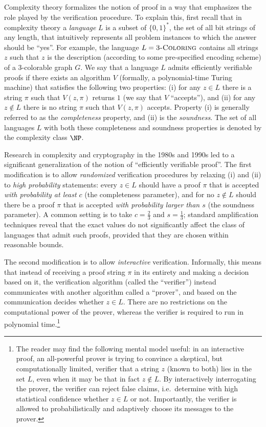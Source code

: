 Complexity theory formalizes the notion of proof in a way that emphasizes the role played by the verification procedure. To explain this, first recall that in complexity theory a \emph{language} $L$ is a subset of $\{0,1\}^*$, the set of all bit strings of any length, that intuitively represents all problem instances to which the answer should be ``yes''. For example, the language $L=\textsc{3-Coloring}$ contains all strings $z$ such that $z$ is the description (according to some pre-specified encoding scheme) of a $3$-colorable graph $G$. We say that a language $L$ admits efficiently verifiable proofs if there exists an algorithm $V$ (formally, a polynomial-time Turing machine) that satisfies the following two properties: (i) for any $z\in L$ there is a string $\pi$ such that $V(z,\pi)$ returns $1$ (we say that $V$ ``accepts''), and (ii) for any $z\notin L$ there is no string $\pi$ such that $V(z,\pi)$ accepts. Property (i) is generally referred to as the \emph{completeness} property, and (ii) is the \emph{soundness}. The set of all languages $L$ with both these completeness and soundness properties is denoted by the complexity class $\NP$.


Research in complexity and cryptography in the 1980s and 1990s led to a significant generalization of the notion of ``efficiently verifiable proof''. The first modification is to allow \emph{randomized} verification procedures by relaxing (i) and (ii) to \emph{high probability} statements: every $z\in L$ should have a proof $\pi$ that is accepted \emph{with probability at least $c$} (the completeness parameter), and for no $z\notin L$ should there be a proof $\pi$ that is accepted \emph{with probability larger than $s$} (the soundness parameter).
A common setting is to take $c=\frac{2}{3}$ and $s=\frac{1}{3}$; standard amplification techniques reveal that the exact values do not significantly affect the class of languages that admit such proofs, provided that they are chosen within reasonable bounds. 

The second modification is to allow \emph{interactive} verification. 
Informally, this means that instead of receiving a proof string $\pi$ in its entirety and making a decision based on it, the verification algorithm (called the ``verifier'') instead communicates with another algorithm called a ``prover'', and based on the communication decides whether $z\in L$. There are no restrictions on the computational power of the prover, whereas the verifier is required to run in polynomial time.\footnote{The reader may find the following mental model useful: in an interactive proof, an all-powerful prover is trying to convince a skeptical, but computationally limited, verifier that a string $z$ (known to both) lies in the set $L$, even when it may be that in fact $z \notin L$. By interactively interrogating the prover, the verifier can reject false claims, i.e.\ determine with high statistical confidence whether $z \in L$ or not. Importantly, the verifier is allowed to probabilistically and adaptively choose its messages to the prover. }




